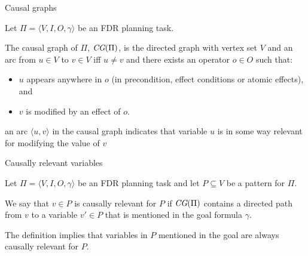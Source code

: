 \documentclass{gkibeamer}
\begin{document}
\begin{frame}{Causal graphs}
  \begin{definition}
    Let $\Pi = \langle V, I, O, \gamma\rangle$ be an FDR planning task.

    The \alert{causal graph} of $\Pi$, \alert{$\textit{CG}(\Pi)$}, is the
    directed graph with vertex set $V$ and an arc from $u \in V$ to
    $v \in V$ iff $u \neq v$ and there exists an operator $o \in O$
    such that:
    \begin{itemize}
    \item $u$ appears anywhere in $o$ (in precondition, effect
      conditions or atomic effects), and
    \item $v$ is modified by an effect of $o$.
    \end{itemize}
  \end{definition}
   an arc $\langle u, v\rangle$ in the causal graph
  indicates that variable $u$ is in some way relevant for modifying
  the value of $v$
\end{frame}

\begin{frame}{Causally relevant variables}
  \begin{definition}
    Let $\Pi = \langle V, I, O, \gamma\rangle$ be an FDR planning task
    and let $P \subseteq V$ be a pattern for $\Pi$.

    We say that $v \in P$ is \alert{causally relevant for $P$} if
    $\textit{CG}(\Pi)$ contains a directed path from $v$ to a variable $v' \in
    P$ that is mentioned in the goal formula $\gamma$.
  \end{definition}
   The definition implies that variables in $P$
  mentioned in the goal are always causally relevant for $P$.
\end{frame}
\end{document}
